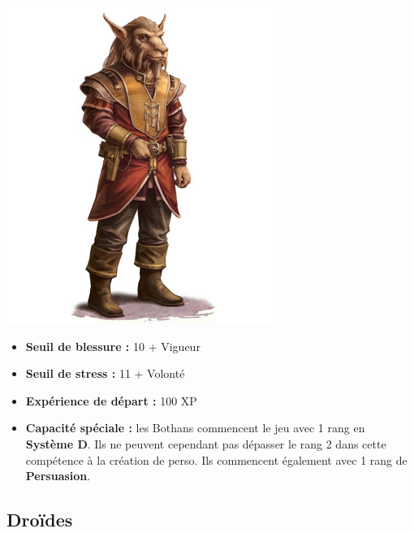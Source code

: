 \documentclass[twoside]{article}
\begin{document}
\noindent\begin{minipage}{0.3\textwidth}
	\includegraphics[width=1\linewidth]{../_img/species/bothan}
\end{minipage}%
\hfill%
\begin{minipage}{0.7\textwidth}\raggedleft
	\begin{itemize}
		\item \textbf{Seuil de blessure :} 10 + Vigueur 
		\item \textbf{Seuil de stress :} 11 + Volonté 
		\item \textbf{Expérience de départ :} 100 XP
		\item \textbf{Capacité spéciale :} les Bothans commencent le jeu avec 1 rang en \textbf{Système D}. Ils ne peuvent cependant pas dépasser le rang 2 dans cette compétence à la création de perso. Ils commencent également avec 1 rang de \textbf{Persuasion}.
	\end{itemize}
\end{minipage}

\subsection*{Droïdes}
\end{document}
